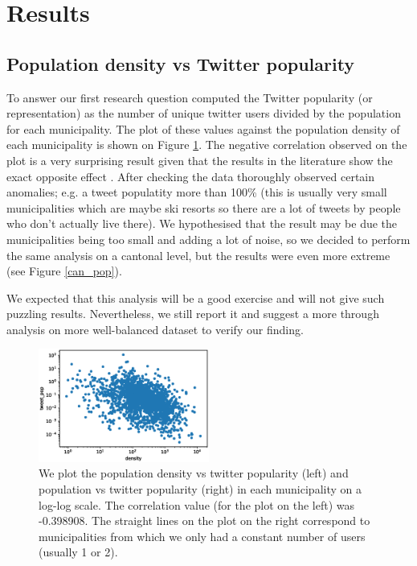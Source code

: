 \section{Results}

\subsection{Population density vs Twitter popularity}

To answer our first research question computed the Twitter popularity (or representation) as the number of unique twitter users divided by the population for each municipality. The plot of these values against the population density of 
each municipality is shown on Figure \ref{mun_pop}. The negative correlation observed on the plot is a very surprising result given that the results in the literature show the exact opposite effect \cite{mislove2011understanding}. After checking the data thoroughly observed certain anomalies; e.g. a tweet populatity more than 100\% (this is usually very small municipalities which are maybe ski resorts so there are a lot of tweets by people who don't actually live there). We hypothesised that the result may be due the municipalities being too small and adding a lot of noise, so we decided to perform the same analysis on a cantonal level, but the results were even more extreme (see Figure \ref{can_pop}).

We expected that this analysis will be a good exercise and will not give such puzzling results. Nevertheless, we still report it and suggest a more through analysis on more well-balanced dataset to verify our finding.

\begin{figure}[h]
  \includegraphics[width=0.5\textwidth]{images/mun_density_pop.eps}
  \caption{We plot the population density vs twitter popularity (left) and population vs twitter popularity (right) in each municipality on a log-log scale. The correlation value (for the plot on the left) was -0.398908. The straight lines on the plot on the right correspond to municipalities from which we only had a constant number of users (usually 1 or 2).}
  \label{mun_pop}
\end{figure}


